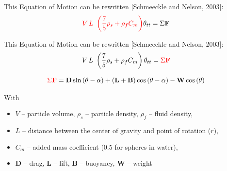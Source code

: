 \documentclass{beamer}
\newcommand{\topline}{%
 \tikz[remember picture,overlay] {%
   \draw[black!100] ([yshift=-1cm]current page.north west)
            --([yshift=-1cm,xshift=\paperwidth]current page.north west);}}
\begin{document}
\begin{frame}[t]%
{}

\end{frame}


\begin{frame}[t]%
This Equation of Motion can be rewritten [Schmeeckle and Nelson, 2003]:
$$
{\color{red} V\,L\ \left(\frac{7}{5}\rho_s+\rho_f C_m\right)}\theta_{tt}=\Sigma \mathbf{F}$$
\end{frame}

\begin{frame}[t]%
This Equation of Motion can be rewritten [Schmeeckle and Nelson, 2003]:
$$
V\,L\ \left(\frac{7}{5}\rho_s+\rho_f C_m\right)\theta_{tt}={\color{red}\Sigma \mathbf{F}}$$

$$
{\color{red}\Sigma \mathbf{F}}=\mathbf{D}\sin{(\theta-\alpha)}+
(\mathbf{L}+\mathbf{B})\cos{(\theta -
\alpha)} - \mathbf{W}\cos{(\theta)}$$


With
\begin{itemize}
  \item[]$V$ -- particle volume, $\rho_s$ -- particle density, $\rho_f$ -- fluid density,
  \item[]$L$ -- distance between the center of gravity and point of rotation ($r$),
  \item[]$C_m$ -- added mass coefficient (0.5 for spheres in water),
  \item[]$\mathbf{D}$ -- drag, $\mathbf{L}$ -- lift, $\mathbf{B}$ -- buoyancy, $\mathbf{W}$ -- weight
\end{itemize}

\end{frame}
\end{document}
